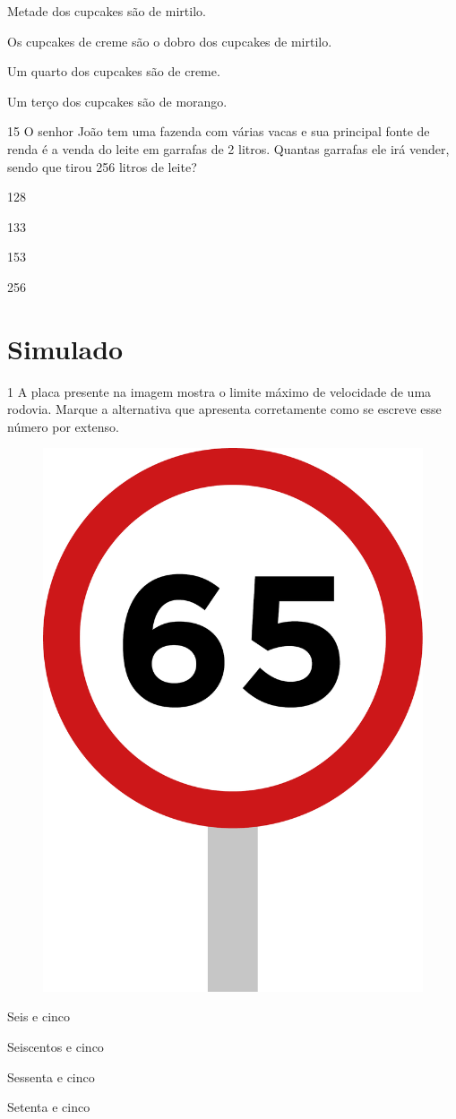 \begin{escolha}[itemsep=-5pt]
\item Metade dos cupcakes são de mirtilo.

\item Os cupcakes de creme são o dobro dos cupcakes de mirtilo.

\item Um quarto dos cupcakes são de creme.

\item Um terço dos cupcakes são de morango.
\end{escolha}


\num{15} O senhor João tem uma fazenda com várias vacas e sua principal fonte de renda é a venda do leite em garrafas de 2 litros. Quantas
garrafas ele irá vender, sendo que tirou 256 litros de leite?

\begin{escolha}[itemsep=-5pt]
\item 128

\item 133

\item 153

\item 256
\end{escolha}

\chapter[Simulado 4]{Simulado}

\num{1} A placa presente na imagem mostra o limite máximo de velocidade de uma
rodovia. Marque a alternativa que apresenta corretamente como se escreve
esse número por extenso.

\begin{figure}[H]
\centering
\includegraphics[width=.25\textwidth]{./media/image151.png}
\end{figure}

\begin{multicols}{2}
\begin{escolha}[itemsep=-5pt]
\item Seis e cinco

\item Seiscentos e cinco

\item Sessenta e cinco

\item Setenta e cinco
\end{escolha}
\end{multicols}

